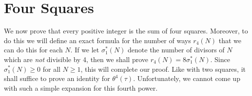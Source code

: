 \documentclass{article}
\theoremstyle{plain}
\newtheorem{theorem}{Theorem}
\theoremstyle{remark}
\theoremstyle{definition}
\begin{document}
\section{Four Squares}

We now prove that every positive integer is the sum of four squares. Moreover, to do this we will define an exact formula for the number of ways $r_4(N)$ that we can do this for each $N$. If we let $\sigma_1^*(N)$ denote the number of divisors of $N$ which are {\it not} divisible by 4, then we shall prove $r_4(N) = 8 \sigma_1^*(N)$. Since $\sigma_1^*(N) \geq 0$ for all $N \geq 1$, this will complete our proof. Like with two squares, it shall suffice to prove an identity for $\theta^4(\tau)$. Unfortunately, we cannot come up with such a simple expansion for this fourth power.


%
%
%
%
\end{document}
